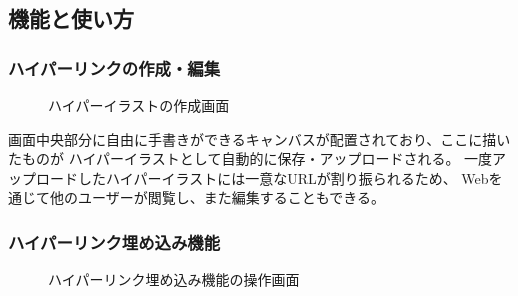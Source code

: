 \subsection{機能と使い方}


\subsubsection{ハイパーリンクの作成・編集}

\begin{figure}[htbp]
    \begin{center}
         \end{center}
    \caption{ハイパーイラストの作成画面}
    \label{hyperillustcreate}
\end{figure}
画面中央部分に自由に手書きができるキャンバスが配置されており、ここに描いたものが
ハイパーイラストとして自動的に保存・アップロードされる。
一度アップロードしたハイパーイラストには一意なURLが割り振られるため、
Webを通じて他のユーザーが閲覧し、また編集することもできる。

\subsubsection{ハイパーリンク埋め込み機能}

\begin{figure}[htbp]
    \begin{center}
         \end{center}
    \caption{ハイパーリンク埋め込み機能の操作画面}
    \label{hyperlinking}
\end{figure}

